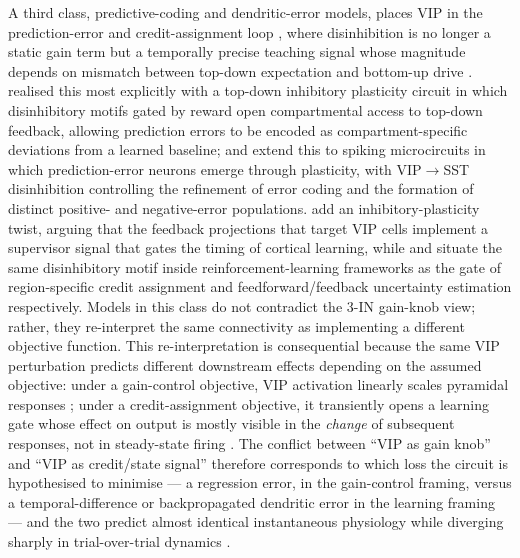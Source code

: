 \documentclass[11pt]{article}
\let\origrightarrow\rightarrow
\def\rightarrow{\ensuremath{\origrightarrow}}
\begin{document}
A third class, predictive-coding and dendritic-error models, places VIP in the prediction-error and credit-assignment loop \citep{Hertag2019, Hertag2020, Hertag2021, Hertag2023, Lee2025, Rossbroich2025, Nemati2025a, Nemati2025b, Shipp2016}, where disinhibition is no longer a static gain term but a temporally precise teaching signal whose magnitude depends on mismatch between top-down expectation and bottom-up drive . \citet{Wilmes2019} realised this most explicitly with a top-down inhibitory plasticity circuit in which disinhibitory motifs gated by reward open compartmental access to top-down feedback, allowing prediction errors to be encoded as compartment-specific deviations from a learned baseline; \citet{Hertag2020} and \citet{Hertag2021} extend this to spiking microcircuits in which prediction-error neurons emerge through plasticity, with VIP\rightarrow SST disinhibition controlling the refinement of error coding and the formation of distinct positive- and negative-error populations. \citet{Wilmes2019} add an inhibitory-plasticity twist, arguing that the feedback projections that target VIP cells implement a supervisor signal that gates the timing of cortical learning, while \citep{Chevy2024} and \citep{Hertag2023} situate the same disinhibitory motif inside reinforcement-learning frameworks as the gate of region-specific credit assignment and feedforward/feedback uncertainty estimation respectively. Models in this class do not contradict the 3-IN gain-knob view; rather, they re-interpret the same connectivity as implementing a different objective function. This re-interpretation is consequential because the same VIP perturbation predicts different downstream effects depending on the assumed objective: under a gain-control objective, VIP activation linearly scales pyramidal responses \citep{Hertag2019, Veit2023}; under a credit-assignment objective, it transiently opens a learning gate whose effect on output is mostly visible in the \textit{change} of subsequent responses, not in steady-state firing \citep{Lee2025, Chevy2024}. The conflict between ``VIP as gain knob'' and ``VIP as credit/state signal'' therefore corresponds to which loss the circuit is hypothesised to minimise --- a regression error, in the gain-control framing, versus a temporal-difference or backpropagated dendritic error in the learning framing --- and the two predict almost identical instantaneous physiology while diverging sharply in trial-over-trial dynamics \citep{Hertag2020, Lee2025, Krabbe2019}.
\end{document}
